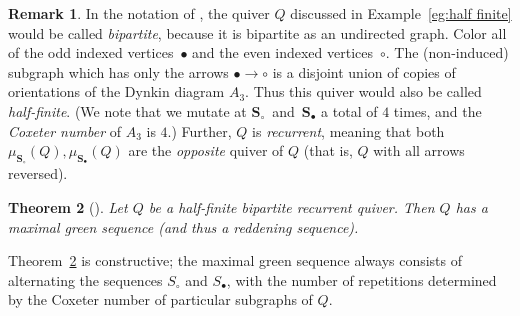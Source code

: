 \documentclass[11pt, letterpaper]{amsart}
\newtheorem{theorem}{Theorem}[section]
\theoremstyle{definition}
\newtheorem{remark}[theorem]{Remark}
\numberwithin{equation}{section}
\begin{document}
\begin{remark}
\label{rem:half finite notation} 
In the notation of \cite{MR4183151}, the quiver $Q$ discussed in Example~\ref{eg:half finite} would be called \emph{bipartite}, because it is bipartite as an undirected graph.
Color all of the odd indexed vertices~$\bullet$ and the even indexed vertices~$\circ$.
The (non-induced) subgraph which has only the arrows $\bullet \rightarrow \circ$ is a disjoint union of copies of orientations of the Dynkin diagram $A_3$.
Thus this quiver would also be called 
\emph{half-finite}.
(We note that we mutate at $\mathbf S_\circ$~and~$\mathbf S_\bullet$ a total of $4$ times, and the \emph{Coxeter number} of $A_3$ is $4$.)
Further, $Q$ is \emph{recurrent}, meaning that both $\mu_{\mathbf S_\circ}(Q), \mu_{\mathbf S_\bullet}(Q)$ are the \emph{opposite} quiver of $Q$ (that is, $Q$ with all arrows reversed).
\end{remark}


\begin{theorem}[{\cite[Theorem~5.3]{MR4183151}}]
\label{thm:half finite red}
Let $Q$ be a \emph{half-finite bipartite recurrent} quiver. %
Then $Q$ has a maximal green sequence (and thus a reddening sequence). %
\end{theorem}

Theorem~\ref{thm:half finite red} is constructive; the maximal green sequence always consists of alternating the sequences $S_\circ$ and $S_\bullet$, with the number of repetitions determined by the Coxeter number of particular subgraphs of $Q$.


\end{document}
